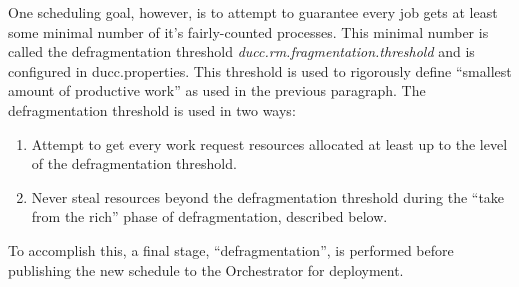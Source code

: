     One scheduling goal, however, is to attempt to guarantee every job gets
    at least some minimal number of it's fairly-counted processes.  This minimal number
    is called the defragmentation threshold
    {\em ducc.rm.fragmentation.threshold}
    and is configured in ducc.properties.  This threshold is used to rigorously define
    ``smallest amount of productive work'' as used in the previous paragraph.
    The defragmentation threshold is used in
    two ways:

    \begin{enumerate}
      \item Attempt to get every work request resources allocated at least up
        to the level of the defragmentation threshold.
      \item Never steal resources beyond the defragmentation threshold during
        the ``take from the rich'' phase of defragmentation, described below.
    \end{enumerate}
    To accomplish this, a final stage, ``defragmentation'', is
    performed before publishing the new schedule to the Orchestrator
    for deployment.

